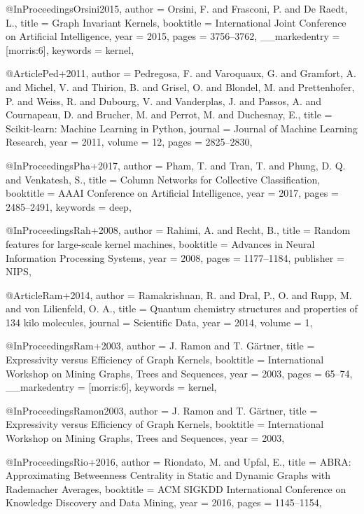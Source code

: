 @InProceedings{Orsini2015,
  author        = {Orsini, F. and Frasconi, P. and De Raedt, L.},
  title         = {Graph Invariant Kernels},
  booktitle     = {International Joint Conference on Artificial Intelligence},
  year          = {2015},
  pages         = {3756--3762},
  __markedentry = {[morris:6]},
  keywords      = {kernel},
}

@Article{Ped+2011,
  author  = {Pedregosa, F. and Varoquaux, G. and Gramfort, A. and Michel, V. and Thirion, B. and Grisel, O. and Blondel, M. and Prettenhofer, P. and Weiss, R. and Dubourg, V. and Vanderplas, J. and Passos, A. and Cournapeau, D. and Brucher, M. and Perrot, M. and Duchesnay, E.},
  title   = {Scikit-learn: Machine Learning in {P}ython},
  journal = {Journal of Machine Learning Research},
  year    = {2011},
  volume  = {12},
  pages   = {2825--2830},
}

@InProceedings{Pha+2017,
  author    = {Pham, T. and Tran, T. and Phung, D. Q. and Venkatesh, S.},
  title     = {Column Networks for Collective Classification},
  booktitle = {AAAI Conference on Artificial Intelligence},
  year      = {2017},
  pages     = {2485--2491},
  keywords  = {deep},
}

@InProceedings{Rah+2008,
  author    = {Rahimi, A. and Recht, B.},
  title     = {Random features for large-scale kernel machines},
  booktitle = {Advances in Neural Information Processing Systems},
  year      = {2008},
  pages     = {1177--1184},
  publisher = {NIPS},
}

@Article{Ram+2014,
  author  = {Ramakrishnan, R. and Dral, P., O. and Rupp, M. and von Lilienfeld, O. A.},
  title   = {Quantum chemistry structures and properties of 134 kilo molecules},
  journal = {Scientific Data},
  year    = {2014},
  volume  = {1},
}

@InProceedings{Ram+2003,
  author        = {J. Ramon and T. G{\"a}rtner},
  title         = {Expressivity versus Efficiency of Graph Kernels},
  booktitle     = {International Workshop on Mining Graphs, Trees and Sequences},
  year          = {2003},
  pages         = {65--74},
  __markedentry = {[morris:6]},
  keywords      = {kernel},
}

@InProceedings{Ramon2003,
  author    = {J. Ramon and T. G{\"a}rtner},
  title     = {Expressivity versus Efficiency of Graph Kernels},
  booktitle = {International Workshop on Mining Graphs, Trees and Sequences},
  year      = {2003},
}

@InProceedings{Rio+2016,
  author    = {Riondato, M. and Upfal, E.},
  title     = {{ABRA:} {A}pproximating Betweenness Centrality in Static and Dynamic Graphs with Rademacher Averages},
  booktitle = {ACM SIGKDD International Conference on Knowledge Discovery and Data Mining},
  year      = {2016},
  pages     = {1145--1154},
}

